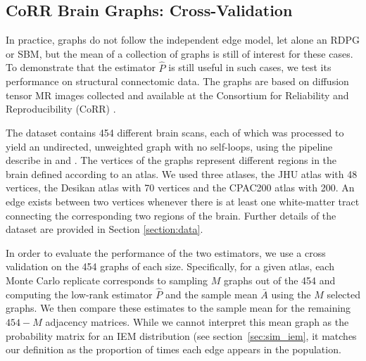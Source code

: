 \documentclass[10pt,letterpaper]{article}
\begin{document}
\subsection{CoRR Brain Graphs: Cross-Validation}\label{sec:corr_data}

In practice, graphs do not follow the independent edge model, let alone an RDPG or SBM, but the mean of a collection of graphs is still of interest for these cases.
To demonstrate that the estimator $\hat{P}$ is still useful in such cases, we test its performance on structural connectomic data. 
The graphs are based on diffusion tensor MR images collected and available at the Consortium for Reliability and Reproducibility (CoRR) \citep{zuo2014open, gorgolewski2015high}.

The dataset contains 454 different brain scans, each of which was processed to yield an undirected, unweighted graph with no self-loops, using the pipeline describe in \citet{gray2013migraine} and \citet{kiar2016m2g}.
The vertices of the graphs represent different regions in the brain defined according to an atlas.
We used three atlases, the JHU atlas with 48 vertices, the Desikan atlas with 70 vertices and the  CPAC200 atlas with 200.
An edge exists between two vertices whenever there is at least one white-matter tract connecting the corresponding two regions of the brain. 
Further details of the dataset are provided in Section \ref{section:data}.

In order to evaluate the performance of the two estimators, we use a cross validation on the 454 graphs of each size. 
Specifically, for a given atlas, each Monte Carlo replicate corresponds to sampling $M$ graphs out of the 454 and computing the low-rank estimator $\hat{P}$ and the sample mean $\bar{A}$ using the $M$ selected graphs. 
We then compare these estimates to the sample mean for the remaining $454-M$ adjacency matrices.
While we cannot interpret this mean graph as the probability matrix for an IEM distribution (see section~\ref{sec:sim_iem}, it matches our definition as the proportion of times each edge appears in the population.

\end{document}
